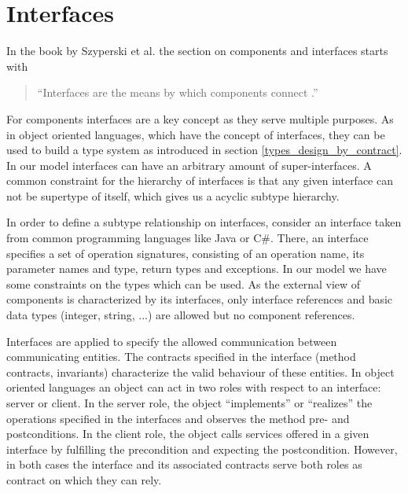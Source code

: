 %
%
%
%

\section{Interfaces} %

In the book by Szyperski et al. the section on components and interfaces starts with

\begin{quote}
"`Interfaces are the means by which components connect \cite[p. 50]{szyperski2002a}."'
\end{quote}

For components interfaces are a key concept as they serve multiple purposes. As in object oriented languages, which have the concept of interfaces, they can be used to build a type system as introduced in section \ref{types_design_by_contract}. In our model interfaces can have an arbitrary amount of super-interfaces. A common constraint for the hierarchy of interfaces is that any given interface can not be supertype of itself, which gives us a acyclic subtype hierarchy.

In order to define a subtype relationship on interfaces, consider an interface taken from common programming languages like Java or C\#. There, an interface specifies a set of operation signatures, consisting of an operation name, its parameter names and type, return types and exceptions. In our model we have some constraints on the types which can be used. As the external view of components is characterized by its interfaces, only interface references and basic data types (integer, string, ...) are allowed but no component references.

Interfaces are applied to specify the allowed communication between communicating entities. The contracts specified in the interface (method contracts, invariants) characterize the valid behaviour of these entities. In object oriented languages an object can act in two roles with respect to an interface: server or client. In the server role, the object "`implements"' or "`realizes"' the operations specified in the interfaces and observes the method pre- and postconditions. In the client role, the object calls services offered in a given interface by fulfilling the precondition and expecting the postcondition. However, in both cases the interface and its associated contracts serve both roles as contract on which they can rely.
 
